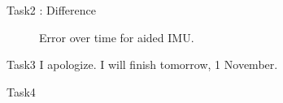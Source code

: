 \documentclass[10pt]{beamer}
\theoremstyle{definition}
\begin{document}
\begin{frame}{Task2 : Difference}
\begin{figure}

    \caption{Error over time for aided IMU.}
    
\end{figure}
\begin{figure}
    
\end{figure}

\end{frame}


\begin{frame}{Task3}
    I apologize. I will finish tomorrow, 1 November.
\end{frame}
\begin{frame}{Task4}
    
\end{frame}



% 
% 
\end{document}
